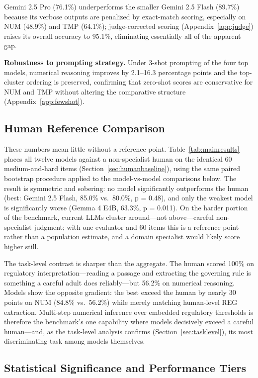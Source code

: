 \documentclass[11pt]{article}
\begin{document}
Gemini 2.5 Pro (76.1\%) underperforms the smaller Gemini 2.5 Flash (89.7\%) because its verbose outputs are penalized by exact-match scoring, especially on NUM (48.9\%) and TMP (64.1\%); judge-corrected scoring (Appendix~\ref{app:judge}) raises its overall accuracy to 95.1\%, eliminating essentially all of the apparent gap.

\textbf{Robustness to prompting strategy.} Under 3-shot prompting of the four top models, numerical reasoning improves by 2.1--16.3 percentage points and the top-cluster ordering is preserved, confirming that zero-shot scores are conservative for NUM and TMP without altering the comparative structure (Appendix~\ref{app:fewshot}).

\subsection{Human Reference Comparison}
\label{sec:humananalysis}

These numbers mean little without a reference point. Table~\ref{tab:mainresults} places all twelve models against a non-specialist human on the identical 60 medium-and-hard items (Section~\ref{sec:humanbaseline}), using the same paired bootstrap procedure applied to the model-vs-model comparisons below. The result is symmetric and sobering: no model significantly outperforms the human (best: Gemini 2.5 Flash, 85.0\% vs.\ 80.0\%, p = 0.48), and only the weakest model is significantly worse (Gemma 4 E4B, 63.3\%, p = 0.011). On the harder portion of the benchmark, current LLMs cluster around---not above---careful non-specialist judgment; with one evaluator and 60 items this is a reference point rather than a population estimate, and a domain specialist would likely score higher still.

The task-level contrast is sharper than the aggregate. The human scored 100\% on regulatory interpretation---reading a passage and extracting the governing rule is something a careful adult does reliably---but 56.2\% on numerical reasoning. Models show the opposite gradient: the best exceed the human by nearly 30 points on NUM (84.8\% vs.\ 56.2\%) while merely matching human-level REG extraction. Multi-step numerical inference over embedded regulatory thresholds is therefore the benchmark's one capability where models decisively exceed a careful human---and, as the task-level analysis confirms (Section~\ref{sec:tasklevel}), its most discriminating task among models themselves.

\subsection{Statistical Significance and Performance Tiers}
\label{sec:significance}
\end{document}
